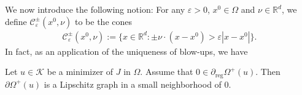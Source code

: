 \documentclass[11pt,reqno]{amsart}
\begin{document}
We now introduce the following notion: For any $\varepsilon>0$, $x^{0}\in\Omega$ and $\nu\in\mathbb{R}^{d}$, we define $\mathcal{C}_{\varepsilon}^{\pm}(x^{0},\nu)$ to be the cones
\begin{align*}
	\mathcal{C}_{\varepsilon}^{\pm}(x^{0},\nu):=\{x\in\mathbb{R}^{d}\colon\pm\nu\cdot(x-x^{0})>\varepsilon|x-x^{0}|\}.
\end{align*}
In fact, as an application of the uniqueness of blow-ups, we have
\begin{corollary}\label{Corollary: Regular free boundary is Lipschitz continuity}
	Let $u\in\mathcal{K}$ be a minimizer of $J$ in $\Omega$. Assume that $0\in\partial_{\mathrm{reg}}\varOmega^{+}(u)$. Then $\partial\varOmega^{+}(u)$ is a Lipschitz graph in a small neighborhood of $0$.
\end{corollary}
\end{document}
